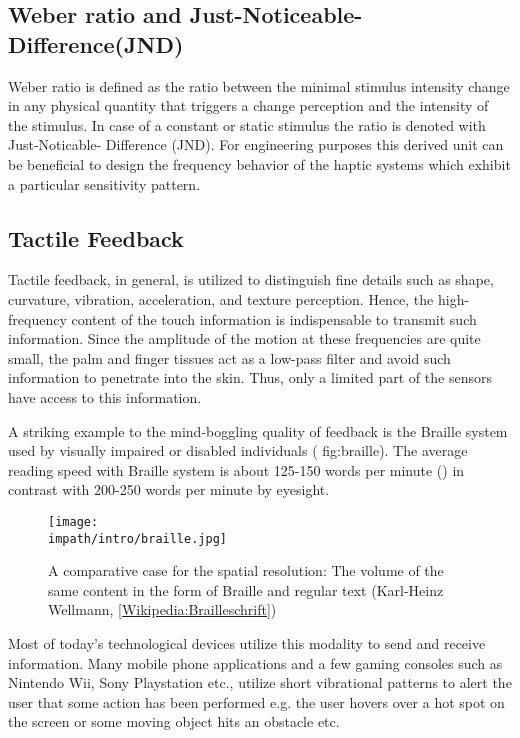 \subsection{Weber ratio and Just-Noticeable-Difference(JND) }

Weber ratio is defined as the ratio between the minimal stimulus intensity change in any physical quantity that triggers a change 
perception and the intensity of the stimulus. In case of a constant or static stimulus the ratio is denoted with Just-Noticable-
Difference (JND). For engineering purposes this derived unit can be beneficial to design the frequency behavior of the haptic systems 
which exhibit a particular sensitivity pattern.


\subsection{Tactile Feedback}

Tactile feedback, in general, is utilized to distinguish fine details such as shape, curvature, vibration, acceleration, and texture 
perception. Hence, the high-frequency content of the touch information is indispensable to transmit such information. Since the amplitude 
of the motion at these frequencies are quite small, the palm and finger tissues act as a low-pass filter and avoid such information to 
penetrate into the skin. Thus, only a limited part of the sensors have access to this information.

A striking example to the mind-boggling quality of feedback is the Braille system used by visually impaired or disabled individuals (\Cref
{fig:braille}). The average reading speed with Braille system is about 125-150 words per minute (\cite{americanblind}) in contrast with 
200-250 words per minute by eyesight. 

\begin{figure}%
\centering
\texttt{[image: \\impath/intro/braille.jpg]}%
\caption[The length comparison of the same content in the form of Braille and 
regular text]{A comparative case for the spatial resolution: The volume of the same 
content in the form of Braille and regular text (Karl-Heinz Wellmann, 
\href{http://de.wikipedia.org/wiki/Brailleschrift}{[Wikipedia:Brailleschrift]})}%
\label{fig:braille}%
\end{figure}

Most of today's technological devices utilize this modality to send and receive information. Many mobile phone applications and a few 
gaming consoles such as Nintendo Wii\raisebox{0.5ex}{\scriptsize\texttrademark}, Sony Playstation\raisebox{0.5ex}{
\scriptsize\texttrademark} etc., utilize short vibrational patterns to alert the user that some action has been performed e.g. the user 
hovers over a hot spot on the screen or some moving object hits an obstacle etc. 

